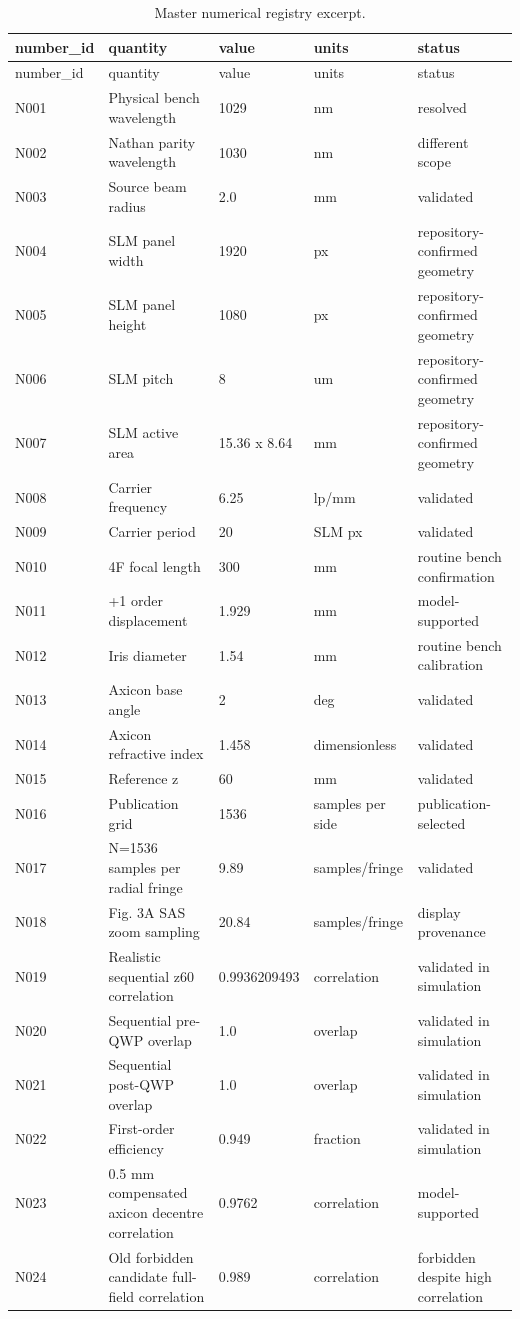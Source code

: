\documentclass[11pt,a4paper]{report}
\begin{document}
\begin{longtable}{p{}p{}p{}p{}p{}}
\caption{Master numerical registry excerpt.}\label{tab:number-registry}\\
\toprule
number\_id & quantity & value & units & status\\
\midrule
\endfirsthead
\toprule
number\_id & quantity & value & units & status\\
\midrule
\endhead
N001 & Physical bench wavelength & 1029 & nm & resolved\\
N002 & Nathan parity wavelength & 1030 & nm & different scope\\
N003 & Source beam radius & 2.0 & mm & validated\\
N004 & SLM panel width & 1920 & px & repository-confirmed geometry\\
N005 & SLM panel height & 1080 & px & repository-confirmed geometry\\
N006 & SLM pitch & 8 & um & repository-confirmed geometry\\
N007 & SLM active area & 15.36 x 8.64 & mm & repository-confirmed geometry\\
N008 & Carrier frequency & 6.25 & lp/mm & validated\\
N009 & Carrier period & 20 & SLM px & validated\\
N010 & 4F focal length & 300 & mm & routine bench confirmation\\
N011 & +1 order displacement & 1.929 & mm & model-supported\\
N012 & Iris diameter & 1.54 & mm & routine bench calibration\\
N013 & Axicon base angle & 2 & deg & validated\\
N014 & Axicon refractive index & 1.458 & dimensionless & validated\\
N015 & Reference z & 60 & mm & validated\\
N016 & Publication grid & 1536 & samples per side & publication-selected\\
N017 & N=1536 samples per radial fringe & 9.89 & samples/fringe & validated\\
N018 & Fig. 3A SAS zoom sampling & 20.84 & samples/fringe & display provenance\\
N019 & Realistic sequential z60 correlation & 0.9936209493 & correlation & validated in simulation\\
N020 & Sequential pre-QWP overlap & 1.0 & overlap & validated in simulation\\
N021 & Sequential post-QWP overlap & 1.0 & overlap & validated in simulation\\
N022 & First-order efficiency & 0.949 & fraction & validated in simulation\\
N023 & 0.5 mm compensated axicon decentre correlation & 0.9762 & correlation & model-supported\\
N024 & Old forbidden candidate full-field correlation & 0.989 & correlation & forbidden despite high correlation\\
\bottomrule
\end{longtable}
\end{document}
